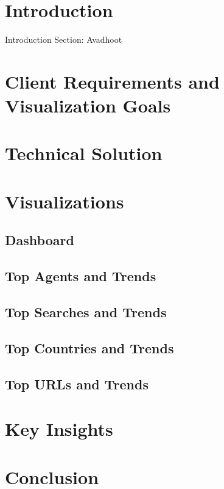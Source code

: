 \section{Introduction}

Introduction Section: Avadhoot

\section{Client Requirements and Visualization Goals}


\section{Technical Solution}


\section{Visualizations}

\subsection{Dashboard}

\subsection{Top Agents and Trends}

\subsection{Top Searches and Trends}

\subsection{Top Countries and Trends}

\subsection{Top URLs and Trends}


\section{Key Insights}


\section{Conclusion}





\appendix


\begin{acks}

\end{acks}
